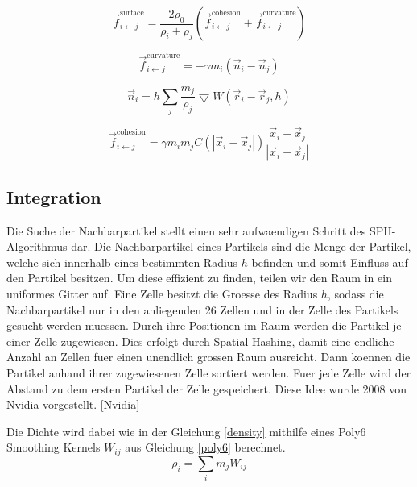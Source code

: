 \documentclass[a4paper]{paper}
\begin{document}
\begin{equation}
\label{surface_tension}
\vec{f}_{i\leftarrow j}^{\text{surface}} = \frac{2\rho_{0}}{\rho_{i}+\rho_{j}} (\vec{f}_{i\leftarrow j}^{\text{cohesion}} + \vec{f}_{i\leftarrow j}^{\text{curvature}})
\end{equation}


\begin{equation}
\label{curvature}
\vec{f}_{i\leftarrow j}^{\text{curvature}} = -\gamma m_{i}(\vec{n}_i - \vec{n}_j)
\end{equation}

\begin{equation}
\vec{n}_{i} = h\sum_{j}\frac{m_{j}}{\rho_{j}}\bigtriangledown W (\vec{r}_{i}-\vec{r}_{j},h)
\end{equation}

\begin{equation}
\label{cohesion}
\vec{f}_{i\leftarrow j}^{\text{cohesion}} = \gamma m_{i} m_{j} C(|\vec{x}_i - \vec{x}_j|)\frac{\vec{x}_i - \vec{x}_j}{|\vec{x}_i - \vec{x}_j|}
\end{equation}

\subsection{Integration}




Die Suche der Nachbarpartikel stellt einen sehr aufwaendigen Schritt des SPH-Algorithmus dar. Die Nachbarpartikel eines Partikels sind die Menge der Partikel, welche sich innerhalb eines bestimmten Radius $h$ befinden und somit Einfluss auf den Partikel besitzen. Um diese effizient zu finden, teilen wir den Raum in ein uniformes Gitter auf. Eine Zelle besitzt die Groesse des Radius $h$, sodass die Nachbarpartikel nur in den anliegenden 26 Zellen und in der Zelle des Partikels gesucht werden muessen. Durch ihre Positionen im Raum werden die Partikel je einer Zelle zugewiesen. Dies erfolgt durch Spatial Hashing, damit eine endliche Anzahl an Zellen fuer einen unendlich grossen Raum ausreicht. Dann koennen die Partikel anhand ihrer zugewiesenen Zelle sortiert werden. Fuer jede Zelle wird der Abstand zu dem ersten Partikel der Zelle gespeichert. Diese Idee wurde 2008 von Nvidia vorgestellt. \ref{Nvidia}

Die Dichte wird dabei wie in der Gleichung \ref{density} mithilfe eines Poly6 Smoothing Kernels $W_{ij}$ aus Gleichung \ref{poly6} berechnet.
\begin{equation}
\label{density}
\rho_i = \sum_i{m_j W_{ij}}
\end{equation}
\end{document}
